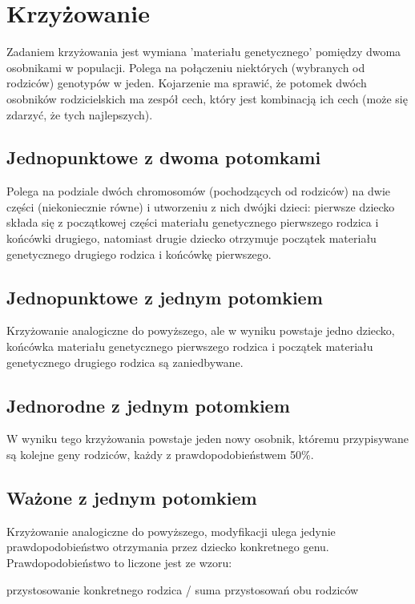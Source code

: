 \documentclass[11pt]{aghdpl}
\begin{document}
\chapter{Krzyżowanie}
\label{cha:crossing}
Zadaniem krzyżowania jest wymiana 'materiału genetycznego' pomiędzy dwoma osobnikami w populacji. Polega na połączeniu 
niektórych (wybranych od rodziców) genotypów w jeden. Kojarzenie ma sprawić, że potomek dwóch osobników rodzicielskich 
ma zespół cech, który jest kombinacją ich cech (może się zdarzyć, że tych najlepszych). 
 
\section{Jednopunktowe z dwoma potomkami}
\label{sec:jedenDwa}
Polega na podziale dwóch chromosomów (pochodzących od rodziców) na dwie części (niekoniecznie równe) i utworzeniu z nich 
dwójki dzieci: pierwsze dziecko składa się z początkowej części materiału genetycznego pierwszego rodzica i końcówki drugiego, 
natomiast drugie dziecko otrzymuje początek materiału genetycznego drugiego rodzica i końcówkę pierwszego.

\section{Jednopunktowe z jednym potomkiem}
\label{sec:jedenJeden}
Krzyżowanie analogiczne do powyższego, ale w wyniku powstaje jedno dziecko, końcówka materiału genetycznego pierwszego 
rodzica i początek materiału genetycznego drugiego rodzica są zaniedbywane.

\section{Jednorodne z jednym potomkiem}
\label{sec:uniform}
W wyniku tego krzyżowania powstaje jeden nowy osobnik, któremu przypisywane są kolejne geny rodziców, każdy z prawdopodobieństwem 50\%.

\section{Ważone z jednym potomkiem}
\label{sec:wazone}
Krzyżowanie analogiczne do powyższego, modyfikacji ulega jedynie prawdopodobieństwo otrzymania przez dziecko konkretnego genu. 
Prawdopodobieństwo to liczone jest ze wzoru:
\begin{center}
przystosowanie konkretnego rodzica / suma przystosowań obu rodziców
\end{center}
\end{document}

